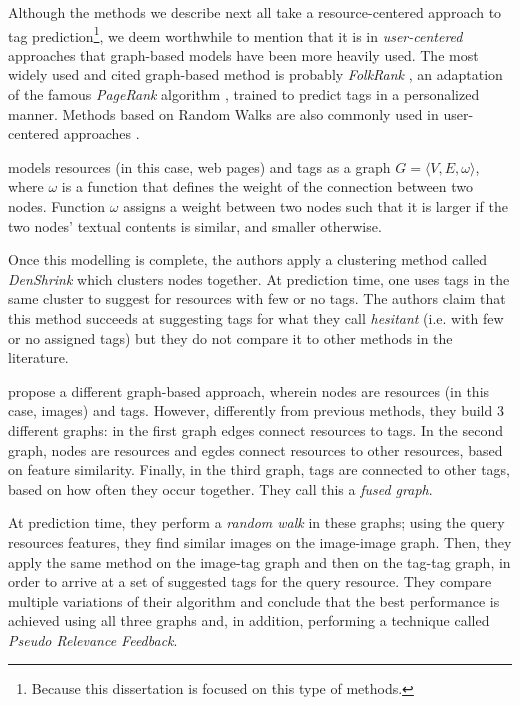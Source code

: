 Although the methods we describe next all take a resource-centered approach to tag prediction\footnote{Because this dissertation is focused on this type of methods.}, we deem worthwhile to mention that it is in \textit{user-centered} approaches that graph-based models have been more heavily used. The most widely used and cited graph-based method is probably \textit{FolkRank} \citep{jaeschke_etal_2007}, an adaptation of the famous \textit{PageRank} algorithm \citep{page_etal_1999}, trained to predict tags in a personalized manner. Methods based on Random Walks are also commonly used in user-centered approaches \citep{mrosek_etal_2009,si_etal_2009,jin_etal_2010}.   

\cite{wang_etal_2015} models resources (in this case, web pages) and tags as a graph $G=\langle V,E,\omega \rangle$, where $\omega$ is a function that defines the weight of the connection between two nodes. Function $\omega$ assigns a weight between two nodes such that it is larger if the two nodes' textual contents is similar, and smaller otherwise.

Once this modelling is complete, the authors apply a clustering method called \textit{DenShrink} \citep{huang_etal_2011} which clusters nodes together. At prediction time, one uses tags in the same cluster to suggest for resources with few or no tags. The authors claim that this method succeeds at suggesting tags for what they call \textit{hesitant} (i.e. with few or no assigned tags) but they do not compare it to other methods in the literature.

\cite{kakade_kakade_2013} propose a different graph-based approach, wherein nodes are resources (in this case, images) and tags. However, differently from previous methods, they build 3 different graphs: in the first graph edges connect resources to tags. In the second graph, nodes are resources and egdes connect resources to other resources, based on feature similarity. Finally, in the third graph, tags are connected to other tags, based on how often they occur together. They call this a \textit{fused graph}.

At prediction time, they perform a \textit{random walk} in these graphs; using the query resources features, they find similar images on the image-image graph. Then, they apply the same method on the image-tag graph and then on the tag-tag graph, in order to arrive at a set of suggested tags for the query resource. They compare multiple variations of their algorithm and conclude that the best performance is achieved using all three graphs and, in addition, performing a technique called \textit{Pseudo Relevance Feedback}.

